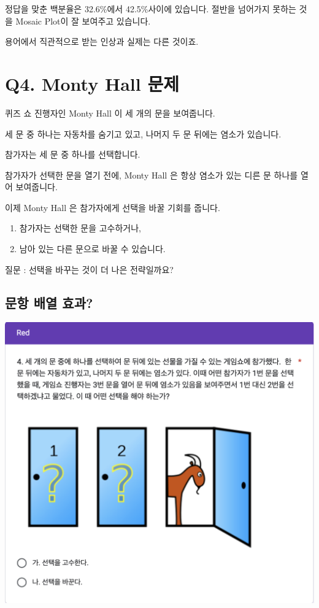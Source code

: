 \documentclass[
]{book}
\begin{document}
정답을 맞춘 백분율은 32.6\%에서 42.5\%사이에 있습니다. 절반을 넘어가지 못하는 것을 Mosaic Plot이 잘 보여주고 있습니다.

용어에서 직관적으로 받는 인상과 실제는 다른 것이죠.

\section{Q4. Monty Hall 문제}\label{q4.-monty-hall-uxbb38uxc81c}

퀴즈 쇼 진행자인 Monty Hall 이 세 개의 문을 보여줍니다.

세 문 중 하나는 자동차를 숨기고 있고, 나머지 두 문 뒤에는 염소가 있습니다.

참가자는 세 문 중 하나를 선택합니다.

참가자가 선택한 문을 열기 전에, Monty Hall 은 항상 염소가 있는 디른 문 하나를 열어 보여줍니다.

이제 Monty Hall 은 참가자에게 선택을 바꿀 기회를 줍니다.

\begin{enumerate}
\def\labelenumi{\arabic{enumi}.}
\item
  참가자는 선택한 문을 고수하거나,
\item
  남아 있는 다른 문으로 바꿀 수 있습니다.
\end{enumerate}

질문 : 선택을 바꾸는 것이 더 나은 전략일까요?

\subsection{문항 배열 효과?}\label{uxbb38uxd56d-uxbc30uxc5f4-uxd6a8uxacfc}

\includegraphics[width=0.75\linewidth]{./pics/Quiz240524_Q4_Red}
\end{document}
